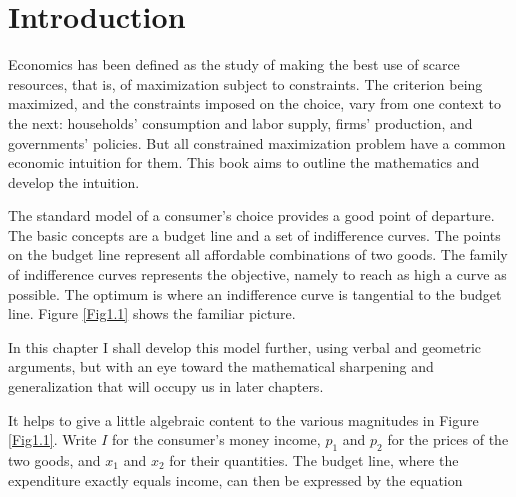 \chapter{Introduction}

Economics has been defined as the study of making the best use of scarce resources, that is, of maximization subject to constraints. The criterion being maximized, and the constraints imposed on the choice, vary from one context to the next: households' consumption and labor supply, firms' production, and governments' policies. But all constrained maximization problem have a common economic intuition for them. This book aims to outline the mathematics and develop the intuition.

The standard model of a consumer's choice provides a good point of departure. The basic concepts are a budget line and a set of indifference curves. The points on the budget line represent all affordable combinations of two goods. The family of indifference curves represents the objective, namely to reach as high a curve as possible. The optimum is where an indifference curve is tangential to the budget line. Figure \ref{Fig1.1} shows the familiar picture.

In this chapter I shall develop this model further, using verbal and geometric arguments, but with an eye toward the mathematical sharpening and generalization that will occupy us in later chapters.

It helps to give a little algebraic content to the various magnitudes in Figure \ref{Fig1.1}. Write $I$ for the consumer's money income, $p_1$ and $p_2$ for the prices of the two goods, and $x_1$ and $x_2$ for their quantities. The budget line, where the expenditure exactly equals income, can then be expressed by the equation



